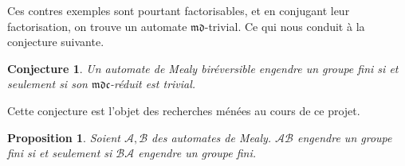 \documentclass[11pt,a4paper]{article}
\newtheorem{prop}{Proposition}
\newtheorem{conj}{Conjecture}
\begin{document}
Ces contres exemples sont pourtant factorisables, et en conjugant leur factorisation, on trouve un automate $\mathfrak{md}$-trivial. Ce qui nous conduit à la conjecture suivante.

\begin{conj}
  \label{conj:birev-mdc}
  Un automate de Mealy biréversible engendre un groupe fini si et seulement si son $\mathfrak{mdc}$-réduit est trivial.
\end{conj}

Cette conjecture est l'objet des recherches ménées au cours de ce projet.

\begin{prop}
  \label{prop:finitude-c}
  Soient $\mathcal{A}, \mathcal{B}$ des automates de Mealy.
  $\mathcal{A}\mathcal{B}$ engendre un groupe fini si et seulement si $\mathcal{B}\mathcal{A}$ engendre un groupe fini.
\end{prop}
\end{document}

